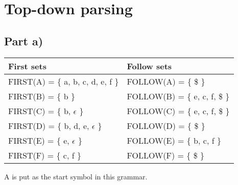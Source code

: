 \documentclass[paper=a4, fontsize=11pt]{scrartcl} %
\numberwithin{equation}{section} %
\numberwithin{figure}{section} %
\numberwithin{table}{section} %
\begin{document}
\section{Top-down parsing}
\subsection{Part a)}
\begin{center}
    \begin{tabular}{ | l | l | }
    \hline
    First sets                              & Follow sets                   \\
    \hline
    FIRST(A) = \{ a, b, c, d, e, f \}       & FOLLOW(A) = \{ \$ \}          \\
    \hline
    FIRST(B) = \{ b \}                      & FOLLOW(B) = \{ e, c, f, \$ \} \\
    \hline
    FIRST(C) = \{ b, $\epsilon$ \}          & FOLLOW(C) = \{ e, c, f, \$ \} \\
    \hline
    FIRST(D) = \{ b, d, e, $\epsilon$ \}    & FOLLOW(D) = \{ \$ \}          \\
    \hline
    FIRST(E) = \{ e, $\epsilon$ \}          & FOLLOW(E) = \{ b, c, f \}     \\
    \hline
    FIRST(F) = \{ c, f \}                   & FOLLOW(F) = \{ \$ \}          \\
    \hline
    \end{tabular}
\end{center}
A is put as the start symbol in this grammar.
\end{document}
